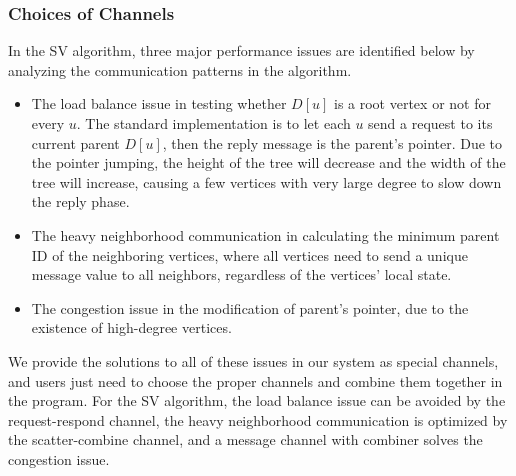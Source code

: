 \documentclass{sokendai_thesis} %
\begin{document}
\subsubsection{Choices of Channels}

In the SV algorithm, three major performance issues are identified below by analyzing the communication patterns in the algorithm.
\begin{itemize}
 \item The load balance issue in testing whether $D[u]$ is a root vertex or not for every $u$.
  The standard implementation is to let each $u$ send a request to its current parent $D[u]$, then the reply message is the parent's pointer.
  Due to the pointer jumping, the height of the tree will decrease and the width of the tree will increase, causing a few vertices with very large degree to slow down the reply phase.
 \item The heavy neighborhood communication in calculating the minimum parent ID of the neighboring vertices, where all vertices need to send a unique message value to all neighbors, regardless of the vertices' local state.
 \item The congestion issue in the modification of parent's pointer, due to the existence of high-degree vertices.
\end{itemize}

We provide the solutions to all of these issues in our system as special channels, and users just need to choose the proper channels and combine them together in the program.
For the SV algorithm,
the load balance issue can be avoided by the request-respond channel, the heavy neighborhood communication is optimized by the scatter-combine channel, and a message channel with combiner solves the congestion issue.
\end{document}
